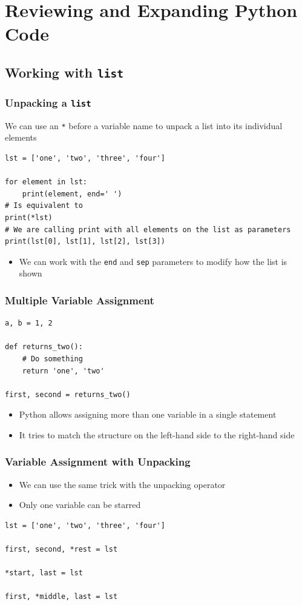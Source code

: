 \documentclass[11pt]{beamer}
\begin{document}
\section{Reviewing and Expanding Python Code}

\subsection{Working with \texttt{list}}

\begin{frame}[fragile]\frametitle{Unpacking a \texttt{list}}
\begin{block}{}
We can use an \lstinline|*| before a variable name to unpack a list into its individual elements
\end{block}
\begin{lstlisting}
lst = ['one', 'two', 'three', 'four']

for element in lst:
    print(element, end=' ')
# Is equivalent to
print(*lst)
# We are calling print with all elements on the list as parameters
print(lst[0], lst[1], lst[2], lst[3])
\end{lstlisting}
\begin{itemize}
\item We can work with the \lstinline|end| and \lstinline|sep| parameters to modify how the list is shown
\end{itemize}
\end{frame}

\begin{frame}[fragile]\frametitle{Multiple Variable Assignment}
\begin{lstlisting}
a, b = 1, 2

def returns_two():
    # Do something
    return 'one', 'two'

first, second = returns_two()
\end{lstlisting}
\begin{itemize}
\item Python allows assigning more than one variable in a single statement
\item It tries to match the structure on the left-hand side to the right-hand side
\end{itemize}
\end{frame}

\begin{frame}[fragile]\frametitle{Variable Assignment with Unpacking}
\begin{itemize}
\item We can use the same trick with the unpacking operator
\item Only one variable can be starred
\end{itemize}
\begin{lstlisting}
lst = ['one', 'two', 'three', 'four']

first, second, *rest = lst

*start, last = lst

first, *middle, last = lst
\end{lstlisting}

\end{frame}
\end{document}
